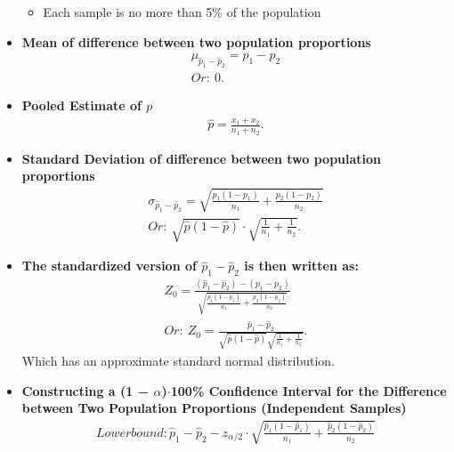 \documentclass{report}
\begin{document}
\begin{itemize}
\begin{itemize}
              \item Each sample is no more than 5\% of the population
            \end{itemize}
            \item \textbf{Mean of difference between two population proportions}
            \begin{align*}
                \mu_{\hat{p}_{1}- \hat{p}_{2}} = p_{1} - p_{2} \\
                Or:\ 0
            .\end{align*}
            \item \textbf{Pooled Estimate of $p $}
              \begin{align*}
                \hat{p} = \frac{x_{1} + x_{2}}{n_{1} + n_{2}}
              .\end{align*}
            \item \textbf{Standard Deviation of difference between two population proportions}
            \begin{align*}
                \sigma_{\hat{p}_{1} - \hat{p}_{2}} =  \sqrt{\frac{p_{1}(1-p_{1})}{n_{1}} + \frac{p_{2}(1-p_{2})}{n_{2}}} \\
                Or:\ \sqrt{\hat{p}(1-\hat{p})} \cdot \sqrt{\frac{1}{n_{1}} +  \frac{1}{n_{2}}}
            .\end{align*}
          \item \textbf{The standardized version of $\hat{p}_{1} - \hat{p}_{2}$ is then written as:}
            \begin{align*}
                Z_{0} = \frac{(\hat{p}_{1} -\hat{p}_{2}) - (p_{1} - p_{2})}{\sqrt{\frac{p_{1}(1-p_{1})}{n_{1}} + \frac{p_{2}(1-p_{2})}{n_{2}}}} \\
                Or:\ Z_{0} = \frac{\hat{p}_{1}-\hat{p}_{2}}{\sqrt{\hat{p}(1-\hat{p})}\sqrt{\frac{1}{n_{1}}+ \frac{1}{n_{2}}}} 
            .\end{align*}
        Which has an approximate standard normal distribution.
    \item \textbf{Constructing a (1 − $\alpha$)$\cdot  $100\% Confidence Interval for the Difference between Two Population Proportions (Independent Samples)}
          \begin{align*}
              Lower bound: \hat{p}_1 - \hat{p}_2 - z_{\alpha/2} \cdot \sqrt{\frac{\hat{p}_1(1 - \hat{p}_1)}{n_1} + \frac{\hat{p}_2(1 - \hat{p}_2)}{n_2}} \\

\end{align*}
\end{itemize}
\end{document}
